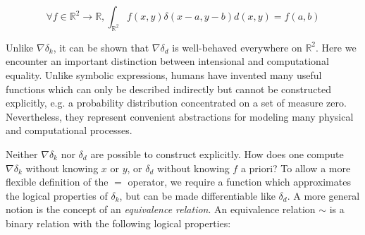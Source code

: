 \documentclass[11pt]{article}
\begin{document}
    $$
    \forall f \in \mathbb{R}^2 \rightarrow \mathbb{R}, \int_{\mathbb{R}^2} f(x,y)\delta(x-a,y-b)d(x, y) = f(a,b)
    $$

    Unlike $\nabla\delta_k$, it can be shown that $\nabla\delta_d$ is well-behaved everywhere on $\mathbb{R}^2$. Here we encounter an important distinction between intensional and computational equality. Unlike symbolic expressions, humans have invented many useful functions which can only be described indirectly but cannot be constructed explicitly, e.g. a probability distribution concentrated on a set of measure zero. Nevertheless, they represent convenient abstractions for modeling many physical and computational processes.

    Neither $\nabla\delta_k$ nor $\delta_d$ are possible to construct explicitly. How does one compute $\nabla\delta_k$ without knowing $x$ or $y$, or $\delta_d$ without knowing $f$ a priori? To allow a more flexible definition of the $=$ operator, we require a function which approximates the logical properties of $\delta_k$, but can be made differentiable like $\delta_d$. A more general notion is the concept of an \textit{equivalence relation}. An equivalence relation $\sim$ is a binary relation with the following logical properties:



\end{document}
